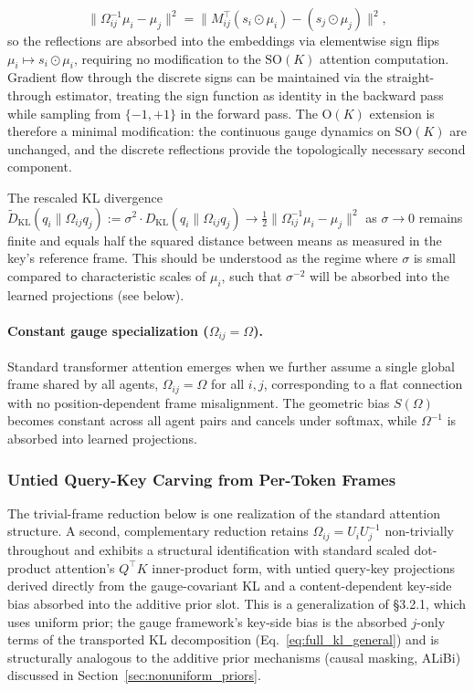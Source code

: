 \documentclass[twoside,11pt]{article}
\begin{document}
%
\begin{equation}
\|\Omega_{ij}^{-1}\mu_i - \mu_j\|^2 = \|M_{ij}^\top(s_i \odot \mu_i) - (s_j \odot \mu_j)\|^2,
\label{eq:ok_mahalanobis}
\end{equation}
%
so the reflections are absorbed into the embeddings via elementwise sign flips $\mu_i \mapsto s_i \odot \mu_i$, requiring no modification to the $\mathrm{SO}(K)$ attention computation. Gradient flow through the discrete signs can be maintained via the straight-through estimator, treating the sign function as identity in the backward pass while sampling from $\{-1,+1\}$ in the forward pass. The $\mathrm{O}(K)$ extension is therefore a minimal modification: the continuous gauge dynamics on $\mathrm{SO}(K)$ are unchanged, and the discrete reflections provide the topologically necessary second component.

The rescaled KL divergence $\widetilde{D}_{\mathrm{KL}}(q_i \| \Omega_{ij}q_j) := \sigma^2 \cdot D_{\mathrm{KL}}(q_i \| \Omega_{ij}q_j) \to \frac{1}{2}\|\Omega_{ij}^{-1}\mu_i - \mu_j\|^2$ as $\sigma \to 0$ remains finite and equals half the squared distance between means as measured in the key's reference frame. This should be understood as the regime where $\sigma$ is small compared to characteristic scales of $\mu_i$, such that $\sigma^{-2}$ will be absorbed into the learned projections (see below).


\paragraph{Constant gauge specialization ($\Omega_{ij} = \Omega$).}

Standard transformer attention emerges when we further assume a single global frame shared by all agents, $\Omega_{ij} = \Omega$ for all $i,j$, corresponding to a flat connection with no position-dependent frame misalignment. The geometric bias $S(\Omega)$ becomes constant across all agent pairs and cancels under softmax, while $\Omega^{-1}$ is absorbed into learned projections.

\subsubsection{Untied Query-Key Carving from Per-Token Frames}
\label{sec:untied_qk}

The trivial-frame reduction below is one realization of the standard attention structure. A second, complementary reduction retains $\Omega_{ij} = U_iU_j^{-1}$ non-trivially throughout and exhibits a structural identification with standard scaled dot-product attention's $Q^\top K$ inner-product form, with untied query-key projections derived directly from the gauge-covariant KL and a content-dependent key-side bias absorbed into the additive prior slot. This is a generalization of \citet{vaswani2017attention} \S3.2.1, which uses uniform prior; the gauge framework's key-side bias is the absorbed $j$-only terms of the transported KL decomposition (Eq.~\ref{eq:full_kl_general}) and is structurally analogous to the additive prior mechanisms (causal masking, ALiBi) discussed in Section~\ref{sec:nonuniform_priors}.
\end{document}
